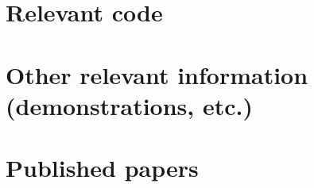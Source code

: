 \appendix
\chapter{Relevant code}


\chapter{Other relevant information (demonstrations, etc.)}


\chapter{Published papers}